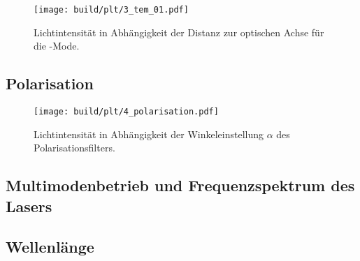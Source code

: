 \begin{figure}
  \centering
   \texttt{[image: build/plt/3\_tem\_01.pdf]}
   \caption{Lichtintensität in Abhängigkeit der Distanz zur optischen Achse für die -Mode.}
   \label{fig:plt:tem_01}
\end{figure}


\subsection{Polarisation}
\lipsum[1]

\begin{figure}
  \centering
   \texttt{[image: build/plt/4\_polarisation.pdf]}
   \caption{Lichtintensität in Abhängigkeit der Winkeleinstellung $\alpha$ des Polarisationsfilters.}
   \label{fig:plt:polarisation}
\end{figure}


\subsection{Multimodenbetrieb und Frequenzspektrum des Lasers}


\subsection{Wellenlänge}
\lipsum[1]

